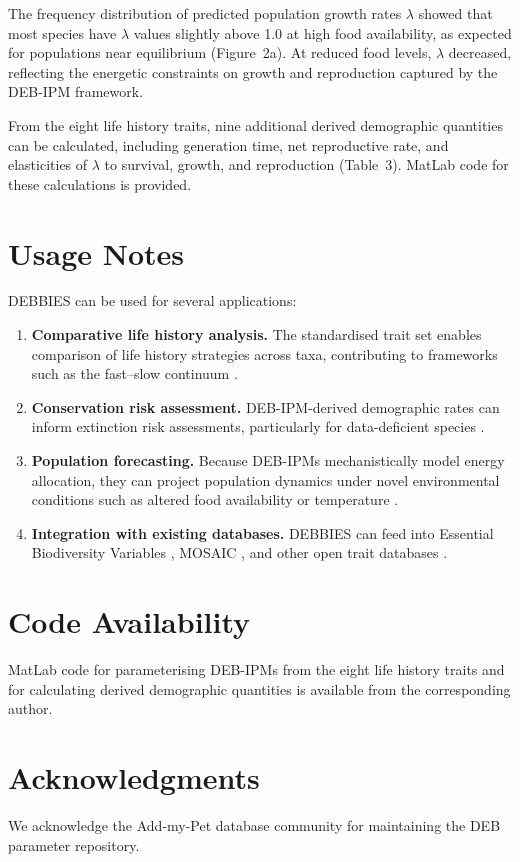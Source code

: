 \documentclass[11pt]{article}
\begin{document}
The frequency distribution of predicted population growth rates $\lambda$ showed that most species have $\lambda$ values slightly above 1.0 at high food availability, as expected for populations near equilibrium (Figure~2a). At reduced food levels, $\lambda$ decreased, reflecting the energetic constraints on growth and reproduction captured by the DEB-IPM framework.

From the eight life history traits, nine additional derived demographic quantities can be calculated, including generation time, net reproductive rate, and elasticities of $\lambda$ to survival, growth, and reproduction (Table~3). MatLab code for these calculations is provided.

\section{Usage Notes}

DEBBIES can be used for several applications:

\begin{enumerate}
    \item \textbf{Comparative life history analysis.} The standardised trait set enables comparison of life history strategies across taxa, contributing to frameworks such as the fast--slow continuum \citep{salguero2016}.
    \item \textbf{Conservation risk assessment.} DEB-IPM-derived demographic rates can inform extinction risk assessments, particularly for data-deficient species \citep{musick2004,jabado2020}.
    \item \textbf{Population forecasting.} Because DEB-IPMs mechanistically model energy allocation, they can project population dynamics under novel environmental conditions such as altered food availability or temperature \citep{vanbeveren1997,smallegange2023}.
    \item \textbf{Integration with existing databases.} DEBBIES can feed into Essential Biodiversity Variables \citep{kissling2018}, MOSAIC \citep{pottier2023}, and other open trait databases \citep{schneider2020}.
\end{enumerate}

\section*{Code Availability}

MatLab code for parameterising DEB-IPMs from the eight life history traits and for calculating derived demographic quantities is available from the corresponding author.

\section*{Acknowledgments}

We acknowledge the Add-my-Pet database community for maintaining the DEB parameter repository.


\end{document}
